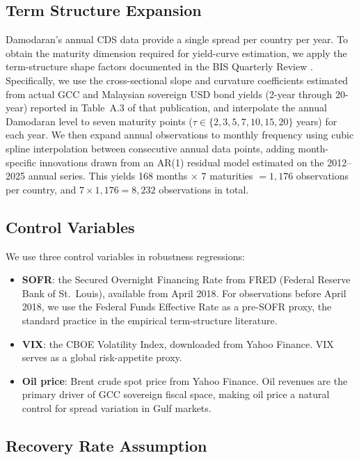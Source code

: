 \documentclass[12pt]{article}
\theoremstyle{plain}
\theoremstyle{definition}
\theoremstyle{remark}
\begin{document}
\subsection{Term Structure Expansion}

Damodaran's annual CDS data provide a single spread per country per year.
To obtain the maturity dimension required for yield-curve estimation, we apply
the term-structure shape factors documented in the BIS Quarterly Review
\citep{BIS2022}. Specifically, we use the cross-sectional slope and curvature
coefficients estimated from actual GCC and Malaysian sovereign USD bond yields
(2-year through 20-year) reported in Table~A.3 of that publication, and
interpolate the annual Damodaran level to seven maturity points
($\tau \in \{2, 3, 5, 7, 10, 15, 20\}$ years) for each year. We then expand
annual observations to monthly frequency using cubic spline interpolation
between consecutive annual data points, adding month-specific innovations
drawn from an AR(1) residual model estimated on the 2012--2025 annual series.
This yields 168 months $\times$ 7 maturities $= 1{,}176$ observations per
country, and $7 \times 1{,}176 = 8{,}232$ observations in total.

\subsection{Control Variables}

We use three control variables in robustness regressions:

\begin{itemize}[noitemsep]
\item \textbf{SOFR}: the Secured Overnight Financing Rate from FRED
  (Federal Reserve Bank of St.~Louis), available from April 2018. For
  observations before April 2018, we use the Federal Funds Effective Rate as a
  pre-SOFR proxy, the standard practice in the empirical term-structure
  literature.

\item \textbf{VIX}: the CBOE Volatility Index, downloaded from Yahoo Finance.
  VIX serves as a global risk-appetite proxy.

\item \textbf{Oil price}: Brent crude spot price from Yahoo Finance. Oil
  revenues are the primary driver of GCC sovereign fiscal space, making oil
  price a natural control for spread variation in Gulf markets.
\end{itemize}

\subsection{Recovery Rate Assumption}
\end{document}
